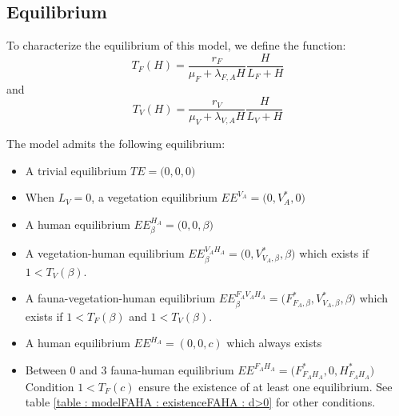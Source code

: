 \documentclass{article}
\newcommand{\lfa}{\lambda_{F, A}}
\newcommand{\lva}{\lambda_{V, A}}
\begin{document}
\subsection{Equilibrium}

To characterize the equilibrium of this model, we define the function:
\begin{equation*}
T_F(H) = \dfrac{r_F}{\mu_F + \lfa H} \dfrac{H}{L_F + H}
\end{equation*}
and
\begin{equation*}
T_V(H) = \dfrac{r_V}{\mu_V + \lva H} \dfrac{H}{L_V + H}
\end{equation*}

The model admits the following equilibrium:

\begin{itemize}
\item A trivial equilibrium $TE = \Big(0,0,0\Big)$
\item When $L_V = 0$, a vegetation equilibrium $EE^{V_A} = \Big(0,V_A^*,0\Big)$
\item A human equilibrium $EE^{H_A}_\beta = \Big(0,0,\beta\Big)$
%

\item A vegetation-human equilibrium $EE^{V_AH_A}_\beta = \Big(0, V^*_{V_A, \beta}, \beta\Big)$ which exists if $1 < T_V(\beta)$.
%

\item A fauna-vegetation-human equilibrium $EE^{F_AV_AH_A}_\beta = \Big(F^*_{F_A, \beta}, V^*_{V_A, \beta}, \beta\Big)$ which exists if $1 < T_F(\beta)$ and $1 < T_V(\beta)$.

\item A human equilibrium $EE^{H_A} = (0, 0, c)$ which always exists

\item Between 0 and 3 fauna-human equilibrium
$EE^{F_AH_A} = \Big(F^*_{F_AH_A}, 0, H^*_{F_AH_A}\Big)$
Condition $1 < T_F(c)$ ensure the existence of at least one equilibrium. See table \ref{table : modelFAHA : existenceFAHA : d>0} for other conditions.


\end{itemize}
\end{document}
